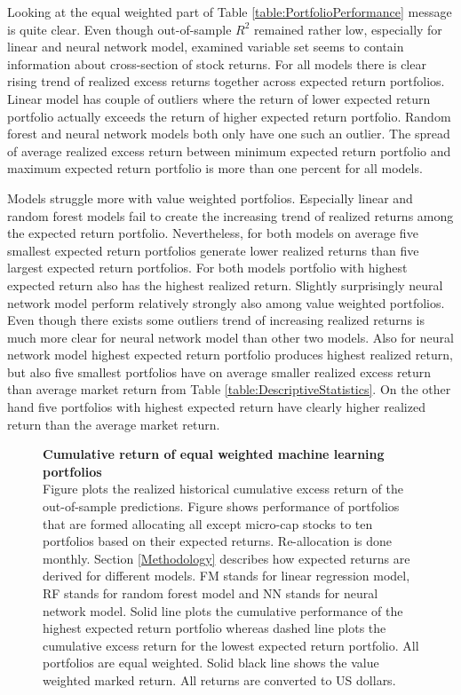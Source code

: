 \documentclass{article}
\begin{document}
Looking at the equal weighted part of Table \ref{table:PortfolioPerformance} message is quite clear. Even though out-of-sample $R^2$ remained rather low, especially for linear and neural network model, examined variable set seems to contain information about cross-section of stock returns. For all models there is clear rising trend of realized excess returns together across expected return portfolios. Linear model has couple of outliers where the return of lower expected return portfolio actually exceeds the return of higher expected return portfolio. Random forest and neural network models both only have one such an outlier. The spread of average realized excess return between minimum expected return portfolio and maximum expected return portfolio is more than one percent for all models.  \par

Models struggle more with value weighted portfolios. Especially linear and random forest models fail to create the increasing trend of realized returns among the expected return portfolio. Nevertheless, for both models on average five smallest expected return portfolios generate lower realized returns than five largest expected return portfolios. For both models portfolio with highest expected return also has the highest realized return. Slightly surprisingly neural network model perform relatively strongly also among value weighted portfolios. Even though there exists some outliers trend of increasing realized returns is much more clear for neural network model than other two models. Also for neural network model highest expected return portfolio produces highest realized return, but also five smallest portfolios have on average smaller realized excess return than average market return from Table \ref{table:DescriptiveStatistics}. On the other hand five portfolios with highest expected return have clearly higher realized return than the average market return. \par

\begin{figure}[ht]
\centering
\caption[Cumulative return of equal weighted machine learning portfolios]{\textbf{Cumulative return of equal weighted machine learning portfolios}\\ Figure plots the realized historical cumulative excess return of the out-of-sample predictions. Figure shows performance of portfolios that are formed allocating all except micro-cap stocks to ten portfolios based on their expected returns. Re-allocation is done monthly. Section \ref{Methodology} describes how expected returns are derived for different models. FM stands for linear regression model, RF stands for random forest model and NN stands for neural network model. Solid line plots the cumulative performance of the highest expected return portfolio whereas dashed line plots the cumulative excess return for the lowest expected return portfolio. All portfolios are equal weighted. Solid black line shows the value weighted marked return. All returns are converted to US dollars.}

\label{plot:cumul_ew_portf_return}
\end{figure}
\end{document}
